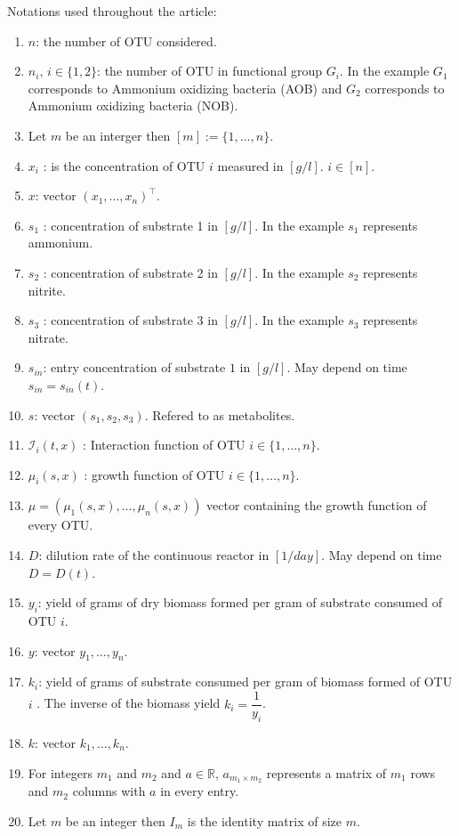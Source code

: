 \documentclass[3p,times]{article}
\newcommand{\R}{\mathbb{R}}
\newcommand{\I}{\mathcal{I}}
\begin{document}
Notations used throughout the article:
\begin{enumerate}
	\item $n$: the number of OTU considered.
	\item $n_i, \, i \in \{1,2\}$: the number of OTU in functional group $G_i$. In the example $G_1$ corresponds to Ammonium oxidizing bacteria (AOB) and $G_2$ corresponds to Ammonium oxidizing bacteria (NOB).
	\item Let $m$ be an interger then $[m]:=\{1,\dots,n \}$. 
	\item $x_i$ :  is the concentration of OTU $i$ measured in $[g/l]$. $i \in [n]$. 
	\item $x$: vector $(x_1,\dots,x_n)^\top$.
	\item $s_1$ : concentration of substrate 1 in $[g/l]$. In the example $s_1$ represents ammonium.
	\item $s_2$ : concentration of substrate 2 in $[g/l]$. In the example $s_2$ represents nitrite. 
	\item $s_3$ : concentration of substrate 3 in $[g/l]$. In the example $s_3$ represents nitrate.
	\item $s_{in}$: entry concentration of substrate $1$ in $[g/l]$. May depend on time $s_{in} = s_{in}(t)$.
	\item $s$:  vector $(s_1,s_2,s_3)$. Refered to as metabolites.
	\item $\I_i(t,x)$ : Interaction function of OTU $i \in \{1,\dots,n\}$.
	\item $\mu_i(s,x)$ : growth function of OTU $i \in \{1,\dots,n\}$.
	\item $\mu = (\mu_1(s,x), \dots, \mu_n(s,x))$ vector containing the growth function of every OTU.
	\item $D$: dilution rate of the continuous reactor in $[1/day]$. May depend on time $D=D(t)$.
	\item $y_i$: yield of grams of dry biomass formed per gram of substrate consumed of OTU $i$.
	\item $y$: vector $y_1,\dots,y_n$.
	\item $k_i$: yield of grams of substrate consumed per gram of biomass formed of OTU $i$ . The inverse of the biomass yield $k_i = \dfrac{1}{y_i}$.
	\item $k$: vector $k_1,\dots,k_n$.
	\item For integers $m_1$ and $m_2$ and $a \in \R$, $a_{m_1 \times m_2}$ represents a matrix of $m_1$ rows and $m_2$ columns with $a$ in every entry. 
	\item Let $m$ be an integer then $I_m$ is the identity matrix of size $m$.

\end{enumerate}
\end{document}

